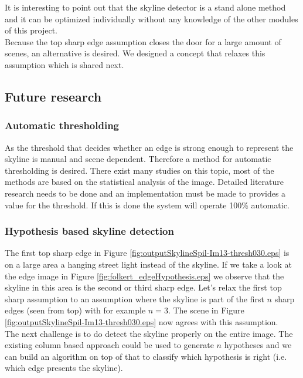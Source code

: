 It is interesting to point out that the skyline detector is a stand alone method
and it can be optimized individually without any knowledge of the other modules
of this project.\\

Because the top sharp edge assumption closes the door for a large amount of
scenes, an alternative is desired. We designed a concept that relaxes this
assumption which is shared next.

\subsection{Future research}
\label{sec:skylinefut}
\subsubsection{Automatic thresholding}
As the threshold that decides whether an edge is strong enough to represent the
skyline is manual and scene dependent. Therefore a method for automatic
thresholding is desired. There exist many studies on this topic, most of the
methods are based on the statistical analysis of the image. Detailed literature
research needs to be done and an implementation must be made to provides a value
for the threshold. If this is done the system will operate 100\% automatic.

\subsubsection{Hypothesis based skyline detection}
The first top sharp edge in Figure \ref{fig:outputSkylineSpil-Im13-thresh030.eps}
is on a large area a hanging street light instead of the skyline.
If we take a look at the edge image in Figure
\ref{fig:folkert_edgeHypothesis.eps} we observe that the skyline in this area is the second or third
sharp edge.
Let's relax the first top sharp assumption to an assumption where the skyline is
part of the first $n$ sharp edges (seen from top) with for example $n=3$.
The scene in Figure \ref{fig:outputSkylineSpil-Im13-thresh030.eps} now agrees with
this assumption.\\
The next challenge is to do detect the skyline properly on the entire image.
The existing column based approach could be used to generate $n$ hypotheses and we can build
an algorithm on top of that to classify which hypothesis is right (i.e. which edge
presents the skyline).

